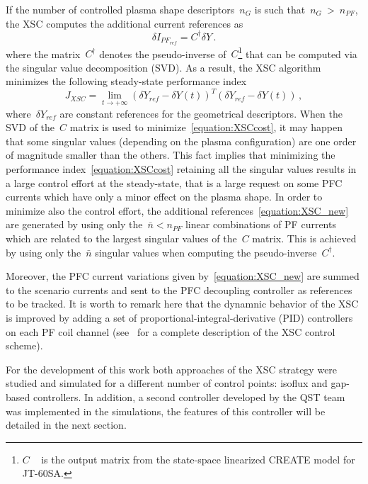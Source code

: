 If the number of controlled plasma shape descriptors~$n_G$ is such that~$n_G~>~n_{PF}$, the XSC computes the additional current references as
\begin{equation}\label{equation:XSC_new}
\delta I_{PF_{ref}}=C^\dag\delta Y\,.
\end{equation}
where the matrix~$C^\dag$ denotes the pseudo-inverse of~$C$\footnote{$C$ ~ is the output matrix from the state-space linearized CREATE model for JT-60SA.} that can be computed via the singular value decomposition (SVD). As a result, the XSC algorithm minimizes the following steady-state performance index
\begin{equation}\label{equation:XSCcost}
J_{XSC} = \lim_{t\to +
	\infty}(\delta Y_{ref}-\delta Y(t))^T(\delta Y_{ref}-\delta Y(t))\,,
\end{equation}
where~$\delta Y_{ref}$ are constant references for the geometrical descriptors. When the SVD of the~$C$ matrix is used to minimize~\eqref{equation:XSCcost}, it may happen that some singular values (depending on the plasma configuration) are one order of magnitude smaller than the others. This fact implies that minimizing the performance index~\eqref{equation:XSCcost} retaining all the singular values results in a large control effort at the steady-state, that is a large request on some PFC currents which have only a minor effect on the plasma shape. In order to minimize also the control effort, the additional references~\eqref{equation:XSC_new} are generated by using only the~$\bar{n}<n_{PF}$ linear combinations of PF currents which are related to the largest singular values of the~$C$ matrix. This is achieved by using only the~$\bar{n}$ singular values when computing the pseudo-inverse~$C^\dag$.
\smallskip

Moreover, the PFC current variations given by~\eqref{equation:XSC_new} are summed to the scenario currents and sent to the PFC decoupling controller as references to be tracked. It is worth to remark here that the dynamnic behavior of the XSC is improved by adding a set of proportional-integral-derivative (PID) controllers on each PF coil channel (see~\cite{Ariola:XSC} for a complete description of the XSC control scheme).
\smallskip

For the development of this work both approaches of the XSC strategy were studied and simulated for a different number of control points: isoflux and gap-based controllers. In addition, a second controller developed by the QST team was implemented in the simulations, the features of this controller will be detailed in the next section.



